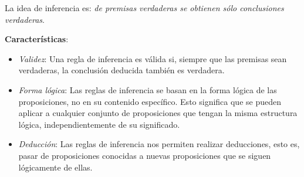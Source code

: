 La idea de inferencia es: \textit{de premisas verdaderas se obtienen sólo conclusiones verdaderas}.

\textbf{Características}:

\begin{itemize}
	\item \textit{Validez}: Una regla de inferencia es válida si, siempre que las premisas sean verdaderas, la conclusión deducida también es verdadera.
	\item \textit{Forma lógica}: Las reglas de inferencia se basan en la forma lógica de las proposiciones, no en su contenido específico. Esto significa que se pueden aplicar a cualquier conjunto de proposiciones que tengan la misma estructura lógica, independientemente de su significado.
	\item \textit{Deducción}: Las reglas de inferencia nos permiten realizar deducciones, esto es, pasar de proposiciones conocidas a nuevas proposiciones que se siguen lógicamente de ellas.
\end{itemize}


